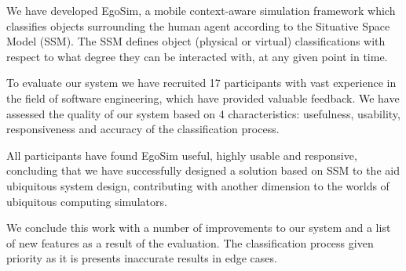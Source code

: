 We have developed EgoSim, a mobile context-aware simulation framework which classifies objects surrounding the human agent according to the Situative Space Model (SSM). The SSM defines object (physical or virtual) classifications with respect to what degree they can be interacted with, at any given point in time.


To evaluate our system we have recruited 17 participants with vast experience in the field of software engineering, which have provided valuable feedback. We have assessed the quality of our system based on 4 characteristics: usefulness, usability, responsiveness and accuracy of the classification process.


All participants have found EgoSim useful, highly usable and responsive, concluding that we have successfully designed a solution based on SSM to the aid ubiquitous system design, contributing with another dimension to the worlds of ubiquitous computing simulators.





We conclude this work with a number of improvements to our system and a list of new features as a result of the evaluation. The classification process given priority as it is presents inaccurate results in edge cases.

\endgroup			

\vfill